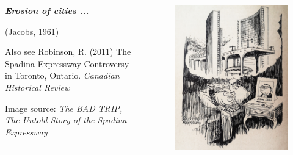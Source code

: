 \documentclass[aspectratio=169]{beamer}
\begin{document}
\begin{frame}
	\begin{columns}
		\begin{column}{0.5\textwidth}
			
			\textbf{\textit{Erosion of cities ...} }
			
			(Jacobs, 1961)
			
			\vspace{8mm}
			
			
			
			\small
			Also see Robinson, R. (2011) The Spadina Expressway Controversy in Toronto, Ontario. \textit{Canadian Historical Review}
			
			
			\vspace{8mm}
			
			\tiny Image source: \textit{The BAD TRIP, The Untold Story of the Spadina Expressway}
			
			
			
		\end{column}
		
		\begin{column}{0.5\textwidth}
			\begin{figure}
				\centering
				\includegraphics[width=1\linewidth]{images/spadina_cartoon.jpg}
			\end{figure}
			
		\end{column}
		
		
		
	\end{columns}
\end{frame}
\end{document}
